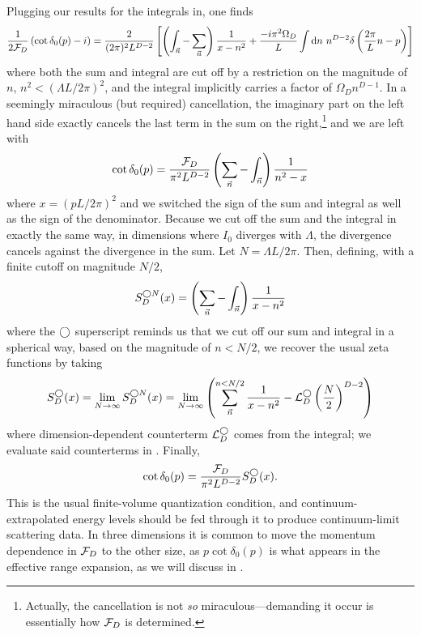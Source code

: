 Plugging our results for the integrals in, one finds
\begin{equation}
    \frac{1}{2\mathcal{F}_D}\left(\cot \delta_0(p) - i\right) = \frac{2}{(2\pi)^2 L^{D-2}}\left[ \left(\int_{\vec{n}} - \sum_{\vec{n}}\right) \frac{1}{x-n^2} + \frac{-i \pi^2\Omega_D}{L} \int \mathrm{d}n\ n^{D-2} \delta\left(\frac{2\pi}{L}n - p\right) \right]
\end{equation}
where both the sum and integral are cut off by a restriction on the magnitude of $n$, $n^2 < (\Lambda L / 2\pi)^2$, and the integral implicitly carries a factor of $\Omega_D n^{D-1}$.
In a seemingly miraculous (but required) cancellation, the imaginary part on the left hand side exactly cancels the last term in the sum on the right,\footnote{Actually, the cancellation is not \emph{so} miraculous---demanding it occur is essentially how $\mathcal{F}_D$ is determined.} and we are left with
\begin{equation}
    \cot \delta_0(p) = \frac{\mathcal{F}_D}{\pi^2 L^{D-2}} \left(\sum_{\vec{n}}-\int_{\vec{n}}\right) \frac{1}{n^2-x}
\end{equation}
where $x=(pL/2\pi)^2$ and we switched the sign of the sum and integral as well as the sign of the denominator.
Because we cut off the sum and the integral in exactly the same way, in dimensions where $I_0$ diverges with $\Lambda$, the divergence cancels against the divergence in the sum.
Let $N=\Lambda L/2\pi$.
Then, defining, with a finite cutoff on magnitude $N/2$,
\begin{equation}\label{eq:spherical cutoff S}
    S^{\bigcirc N}_D(x) = \left(\sum_{\vec{n}}- \int_{\vec{n}}\right) \frac{1}{x-n^2}
\end{equation}
where the $\bigcirc$ superscript reminds us that we cut off our sum and integral in a spherical way, based on the magnitude of $n<N/2$, we recover the usual \Luscher zeta functions by taking
\begin{equation}\label{eq:spherical S}
    S^\bigcirc_D(x)
    =
    \lim_{N\rightarrow\infty} S^{\bigcirc N}_D(x)
    =
    \lim_{N\rightarrow\infty}\left( \sum_{\vec{n}}^{n < N/2} \frac{1}{x-n^2} - \mathcal{L}_D^\bigcirc \left(\frac{N}{2}\right)^{D-2}\right)
\end{equation}
where dimension-dependent counterterm $\mathcal{L}_D^\bigcirc$ comes from the integral; we evaluate said counterterms in .
Finally,
\begin{equation}\label{eq:spherical quantization}
    \cot \delta_0(p) = \frac{\mathcal{F}_D}{\pi^2 L^{D-2}} S^\bigcirc_D(x).
\end{equation}
This is the usual \Luscher finite-volume quantization condition, and continuum-extrapolated energy levels should be fed through it to produce continuum-limit scattering data.
In three dimensions it is common to move the momentum dependence in $\mathcal{F}_D$ to the other size, as $p \cot\delta_0(p)$ is what appears in the effective range expansion, as we will discuss in .

